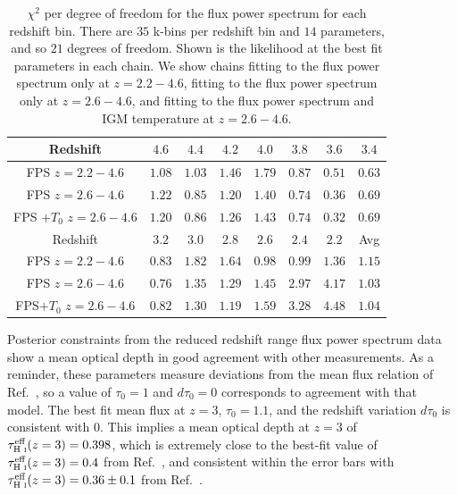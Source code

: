 \begin{table}
	\centering
     \def\arraystretch{1.2}
     \begin{tabular}{|c|c|c|c|c|c|c|c|}
		\hline
		Redshift & $4.6$ & $4.4$ & $4.2$ & $4.0$ & $3.8$ & $3.6$ & $3.4$\\
		\hline
        FPS $z= 2.2-4.6$ & $1.08$ & $1.03$ & $1.46$ & $1.79$ & $0.87$ & $0.51$ & $0.63$ \\
        FPS $z= 2.6-4.6$ & $1.22$ & $0.85$ & $1.20$ & $1.40$ & $0.74$ & $0.36$ & $0.69$\\
        FPS $+ T_0$ $z= 2.6-4.6$ & $1.20$ & $0.86$ & $1.26$ & $1.43$ & $0.74$ & $0.32$ & $0.69$ \\
        \hline
        Redshift & $3.2$ & $3.0$ & $2.8$ & $2.6$ & $2.4$ & $2.2$ & Avg \\
		\hline
        FPS $z= 2.2-4.6$ & $0.83$ & $1.82$ & $1.64$ & $0.98$ & $0.99$ & $1.36$ & $1.15$ \\
        FPS $z= 2.6-4.6$ & $0.76$ & $1.35$ & $1.29$ & $1.45$ & $2.97$ & $4.17$ & $1.03$ \\
        FPS$ + T_0$ $z= 2.6-4.6$ & $0.82$ & $1.30$ & $1.19$ & $1.59$ & $3.28$ & $4.48$ & $1.04$\\
  \hline
	\end{tabular}
    \caption{\label{table:chi2}
    $\chi^2$ per degree of freedom for the flux power spectrum for each redshift bin. There are $35$ k-bins per redshift bin and $14$ parameters, and so $21$ degrees of freedom.
    Shown is the likelihood at the best fit parameters in each chain.
    We show chains fitting to the flux power spectrum only at $z=2.2-4.6$, fitting to the flux power spectrum only at $z=2.6-4.6$, and fitting to the flux power spectrum and IGM temperature at $z=2.6-4.6$.
    }
\end{table}

Posterior constraints from the reduced redshift range flux power spectrum data show a mean optical depth in good agreement with other measurements.
As a reminder, these parameters measure deviations from the mean flux relation of Ref.~\cite{2007MNRAS.382.1657K}, so a value of $\tau_0=1$ and $d\tau_0=0$ corresponds to agreement with that model.
The best fit mean flux at $z=3$, $\tau_0 = 1.1$, and the redshift variation $d\tau_0$ is consistent with $0$.
This implies a mean optical depth at $z=3$ of $\tau^{\text{eff}}_{\text{H~{\sc i}}}(z=3) = 0.398$, which is extremely close to the best-fit value of $\tau^{\text{eff}}_{\text{H~{\sc i}}}(z=3) = 0.4$ from Ref.~\cite{2013MNRAS.430.2067B}, and consistent within the error bars with $\tau^{\text{eff}}_{\text{H~{\sc i}}}(z=3) = 0.36 \pm 0.1$ from Ref.~\cite{2007MNRAS.382.1657K}. 

